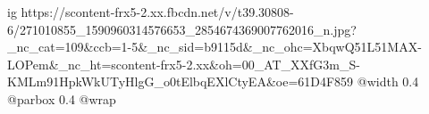  
 
 
 
 

\ifcmt
  ig https://scontent-frx5-2.xx.fbcdn.net/v/t39.30808-6/271010855_1590960314576653_2854674369007762016_n.jpg?_nc_cat=109&ccb=1-5&_nc_sid=b9115d&_nc_ohc=XbqwQ51L51MAX-LOPem&_nc_ht=scontent-frx5-2.xx&oh=00_AT_XXfG3m_S-KMLm91HpkWkUTyHlgG_o0tElbqEXlCtyEA&oe=61D4F859
  @width 0.4
  @parbox 0.4
  @wrap \parpic[l]
\fi
